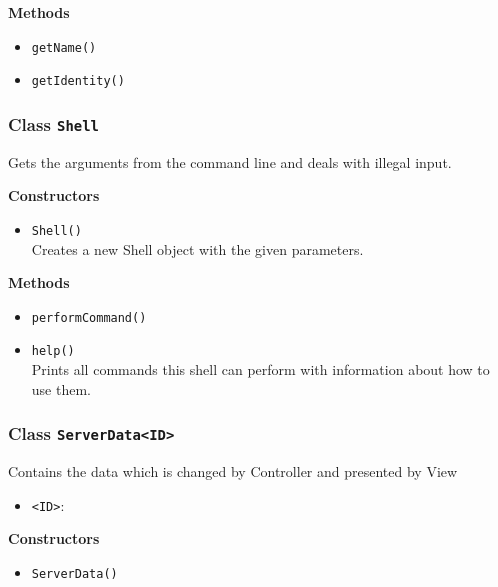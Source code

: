 \textbf{Methods}
\begin{itemize}
\item \lstinline|getName()| \\


\item \lstinline|getIdentity()| \\


\end{itemize}

\subsubsection{Class \lstinline|Shell|}
Gets the arguments from the command line and deals with illegal input.

\textbf{Constructors}
\begin{itemize}
\item \lstinline|Shell()| \\
Creates a new Shell object with the given parameters.

\end{itemize}

\textbf{Methods}
\begin{itemize}
\item \lstinline|performCommand()| \\


\item \lstinline|help()| \\
Prints all commands this shell can perform with information about how to use them.

\end{itemize}

\subsubsection{Class \lstinline|ServerData<ID>|}
Contains the data which is changed by Controller and presented by View
\begin{itemize}
\item \lstinline|<ID>|: 
\end{itemize}

\textbf{Constructors}
\begin{itemize}
\item \lstinline|ServerData()| \\


\end{itemize}

